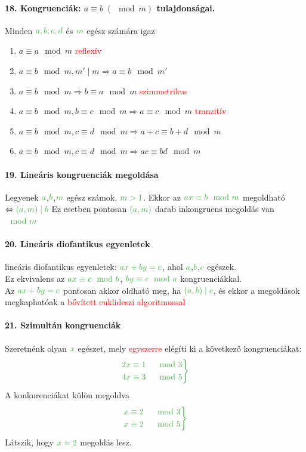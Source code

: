 \documentclass[10pt,a4paper]{article}
\renewcommand{\>}{\rightarrow}
\renewcommand{\a}{\gr{a}}
\renewcommand{\b}{\gr{b}}
\renewcommand{\c}{\gr{c}}
\newcommand{\x}{\gr{x}}
\newcommand{\red}[1]{\textcolor{red}{#1}}
\newcommand{\gr}[1]{\textcolor{FancsaliGreen}{#1}}
\newenvironment{m}
    {\begin{center}
    \begin{mdframed}[backgroundcolor=FancsaliBlue]
    }
    { 
    \end{mdframed}
    \end{center}
    }
\begin{document}
\paragraph{18. Kongruenciák: $a \equiv b \;(\mod m)$ tulajdonságai.}
\begin{m}
Minden $\gr{a,b,c,d}$ és $\gr{m}$ egész számára igaz
\begin{enumerate}
\item $a \equiv a \mod m$ \red{reflexív}
\item $a \equiv b \mod m, m' \mid m \Rightarrow a \equiv b \mod m'$
\item $a \equiv b \mod m  \Rightarrow b \equiv a \mod m $ \red{szimmetrikus} 
\item $a \equiv b \mod m, b\equiv c \mod m \Rightarrow a \equiv c   \mod m $ \red{tranzitív}
\item $a \equiv b \mod m, c \equiv d \mod m \Rightarrow a + c \equiv b+ d \mod m$
\item $a \equiv b \mod m ,c \equiv d \mod m \Rightarrow ac\equiv bd \mod m$
\end{enumerate}
\end{m}
\newpage
\paragraph{19. Lineáris kongruenciák megoldása}
\begin{m}
Legyenek $\a$,$\b$,$\gr{m}$ egész számok, $\gr{m>1}$. Ekkor az $\gr{ax \equiv b \mod m}$ megoldható $\Leftrightarrow \gr{(a,m)\mid b}$ Ez esetben pontosan $\gr{(a,m)}$ darab inkongruens megoldás van $\gr{\mod m}$
\end{m}
\paragraph{20. Lineáris diofantikus egyenletek}
\begin{m}
lineáris diofantikus egyenletek: $\gr{ax+by=c}$, ahol $\a$,$\b$,$\c$ egészek. \\
Ez ekvivalens az $\gr{ax \equiv c \mod b}$, $\gr{by\equiv c \mod a}$ kongruenciákkal. \\
Az $\gr{ax+by = c}$ pontosan akkor oldható meg, ha $\gr{(a,b)\mid c}$, és ekkor a megoldások megkaphatóak a \red{bővített euklideszi algoritmussal} 
\end{m}
\paragraph{21. Szimultán kongruenciák}
\begin{m}
Szeretnénk olyan $\x$ egészet, mely \red{egyszerre} elégíti ki a következő kongruenciákat:
\[\gr
{\begin{rcases}
2x\equiv 1 &\mod 3 \\
4x\equiv 3 &\mod 5
\end{rcases} 
}\]
A konkurenciákat külön megoldva	
\[\gr
{\begin{rcases}
x\equiv 2 &\mod 3 \\
x\equiv 2 &\mod 5
\end{rcases} 
}\]
Látszik, hogy $\gr{x=2}$ megoldás lesz. 
\end{m}
\end{document}
